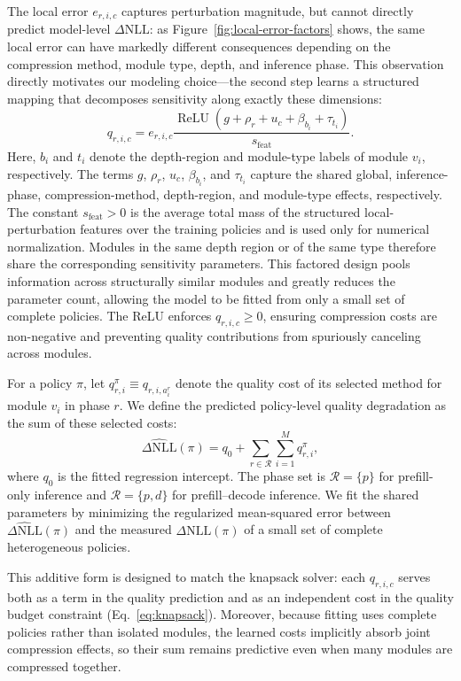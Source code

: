 \documentclass[letterpaper]{article} %
\begin{document}
The local error $e_{r,i,c}$ captures perturbation magnitude, but cannot directly predict model-level $\Delta\mathrm{NLL}$: as Figure~\ref{fig:local-error-factors} shows, the same local error can have markedly different consequences depending on the compression method, module type, depth, and inference phase. This observation directly motivates our modeling choice---the second step learns a structured mapping that decomposes sensitivity along exactly these dimensions:
\begin{equation}
q_{r,i,c}
=
e_{r,i,c}
\frac{
\operatorname{ReLU}
\left(
g+\rho_r+u_c+\beta_{b_i}+\tau_{t_i}
\right)
}{
s_{\mathrm{feat}}
}.
\label{eq:module-quality-cost}
\end{equation}
Here, $b_i$ and $t_i$ denote the depth-region and module-type labels of module $v_i$, respectively. The terms $g$, $\rho_r$, $u_c$, $\beta_{b_i}$, and $\tau_{t_i}$ capture the shared global, inference-phase, compression-method, depth-region, and module-type effects, respectively. The constant $s_{\mathrm{feat}}>0$ is the average total mass of the structured local-perturbation features over the training policies and is used only for numerical normalization. Modules in the same depth region or of the same type therefore share the corresponding sensitivity parameters. This factored design pools information across structurally similar modules and greatly reduces the parameter count, allowing the model to be fitted from only a small set of complete policies. The ReLU enforces $q_{r,i,c}\geq 0$, ensuring compression costs are non-negative and preventing quality contributions from spuriously canceling across modules.

For a policy $\pi$, let $q_{r,i}^{\pi}\equiv q_{r,i,a_i^r}$ denote the quality cost of its selected method for module $v_i$ in phase $r$. We define the predicted policy-level quality degradation as the sum of these selected costs:
\begin{equation}
\widehat{\Delta\mathrm{NLL}}(\pi)
=
q_0+
\sum_{r\in\mathcal{R}}
\sum_{i=1}^{M}
q_{r,i}^{\pi},
\label{eq:policy-quality}
\end{equation}
where $q_0$ is the fitted regression intercept. The phase set is $\mathcal{R}=\{p\}$ for prefill-only inference and $\mathcal{R}=\{p,d\}$ for prefill--decode inference. We fit the shared parameters by minimizing the regularized mean-squared error between $\widehat{\Delta\mathrm{NLL}}(\pi)$ and the measured $\Delta\mathrm{NLL}(\pi)$ of a small set of complete heterogeneous policies.

This additive form is designed to match the knapsack solver: each $q_{r,i,c}$ serves both as a term in the quality prediction and as an independent cost in the quality budget constraint (Eq.~\ref{eq:knapsack}). Moreover, because fitting uses complete policies rather than isolated modules, the learned costs implicitly absorb joint compression effects, so their sum remains predictive even when many modules are compressed together.
\end{document}
